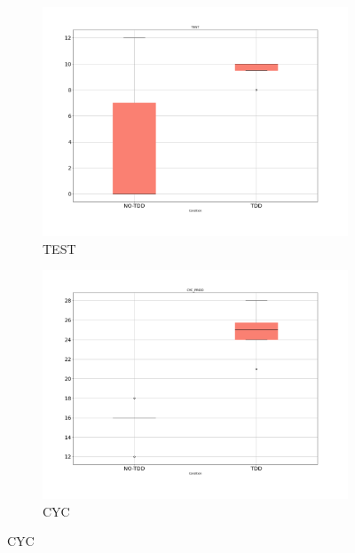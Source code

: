 \begin{figure}[H]
    \begin{subfigure}{0.5\textwidth}
        \includegraphics[width=\linewidth]{figures/box_plots/task1/TEST.png}
        \caption{TEST}
        \label{bp_task1_test}
    \end{subfigure}\hfil
    \begin{subfigure}{0.5\textwidth}
        \includegraphics[width=\linewidth]{figures/box_plots/task1/CYC.png}
        \caption{CYC}
        \label{bp_task1_cyc}
    \end{subfigure}

    \medskip


\end{figure}
